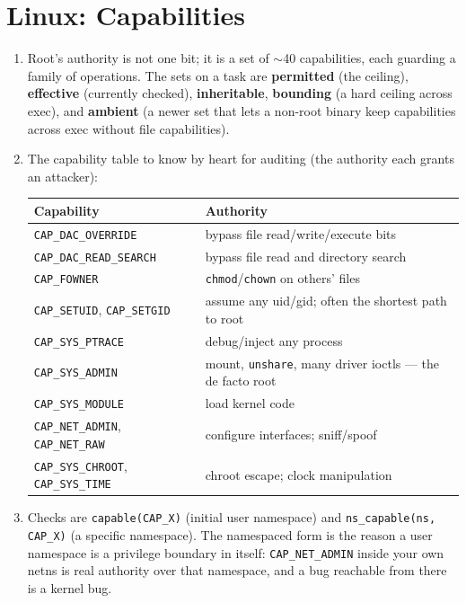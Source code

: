 \documentclass[12pt]{Training}
\begin{document}
\section*{Linux: Capabilities}
\begin{enumerate}
    \item Root's authority is not one bit; it is a set of $\sim$40 capabilities, each guarding a family of operations. The sets on a task are \textbf{permitted} (the ceiling), \textbf{effective} (currently checked), \textbf{inheritable}, \textbf{bounding} (a hard ceiling across exec), and \textbf{ambient} (a newer set that lets a non-root binary keep capabilities across exec without file capabilities).
    \item The capability table to know by heart for auditing (the authority each grants an attacker):
    \begin{center}
    \footnotesize
    \begin{tabular}{@{}ll@{}}
    \toprule
    \textbf{Capability} & \textbf{Authority} \\
    \midrule
    \lstinline|CAP_DAC_OVERRIDE| & bypass file read/write/execute bits \\
    \lstinline|CAP_DAC_READ_SEARCH| & bypass file read and directory search \\
    \lstinline|CAP_FOWNER| & \lstinline|chmod|/\lstinline|chown| on others' files \\
    \lstinline|CAP_SETUID|, \lstinline|CAP_SETGID| & assume any uid/gid; often the shortest path to root \\
    \lstinline|CAP_SYS_PTRACE| & debug/inject any process \\
    \lstinline|CAP_SYS_ADMIN| & mount, \lstinline|unshare|, many driver ioctls --- the de facto root \\
    \lstinline|CAP_SYS_MODULE| & load kernel code \\
    \lstinline|CAP_NET_ADMIN|, \lstinline|CAP_NET_RAW| & configure interfaces; sniff/spoof \\
    \lstinline|CAP_SYS_CHROOT|, \lstinline|CAP_SYS_TIME| & chroot escape; clock manipulation \\
    \bottomrule
    \end{tabular}
    \end{center}
    \item Checks are \lstinline{capable(CAP_X)} (initial user namespace) and \lstinline{ns_capable(ns, CAP_X)} (a specific namespace). The namespaced form is the reason a user namespace is a privilege boundary in itself: \lstinline{CAP_NET_ADMIN} inside your own netns is real authority over that namespace, and a bug reachable from there is a kernel bug.

\end{enumerate}
\end{document}
